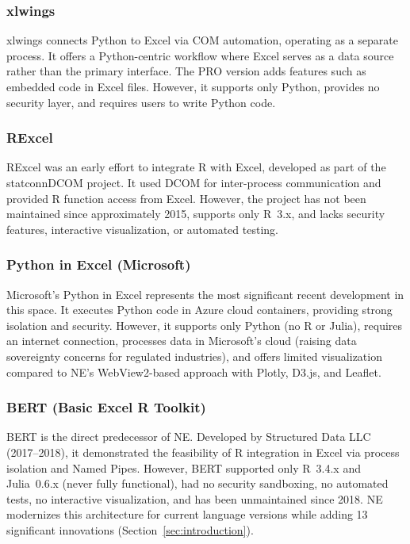 \documentclass[preprint,12pt,authoryear]{elsarticle}
\newcommand{\neven}{NE\raisebox{0.2ex}{v}\rotatebox[origin=c]{180}{E}\rotatebox[origin=c]{180}{N}}
\begin{document}
\subsubsection{xlwings}

xlwings \citep{xlwings2023} connects Python to Excel via COM automation, operating as a separate process. It offers a Python-centric workflow where Excel serves as a data source rather than the primary interface. The PRO version adds features such as embedded code in Excel files. However, it supports only Python, provides no security layer, and requires users to write Python code.

\subsubsection{RExcel}

RExcel \citep{Baier2011} was an early effort to integrate R with Excel, developed as part of the statconnDCOM project. It used DCOM for inter-process communication and provided R function access from Excel. However, the project has not been maintained since approximately 2015, supports only R~3.x, and lacks security features, interactive visualization, or automated testing.

\subsubsection{Python in Excel (Microsoft)}

Microsoft's Python in Excel \citep{MicrosoftPython2023} represents the most significant recent development in this space. It executes Python code in Azure cloud containers, providing strong isolation and security. However, it supports only Python (no R or Julia), requires an internet connection, processes data in Microsoft's cloud (raising data sovereignty concerns for regulated industries), and offers limited visualization compared to \neven{}'s WebView2-based approach with Plotly, D3.js, and Leaflet.

\subsubsection{BERT (Basic Excel R Toolkit)}

BERT \citep{BERT2018} is the direct predecessor of \neven{}. Developed by Structured Data LLC (2017--2018), it demonstrated the feasibility of R integration in Excel via process isolation and Named Pipes. However, BERT supported only R~3.4.x and Julia~0.6.x (never fully functional), had no security sandboxing, no automated tests, no interactive visualization, and has been unmaintained since 2018. \neven{} modernizes this architecture for current language versions while adding 13 significant innovations (Section~\ref{sec:introduction}).
\end{document}
